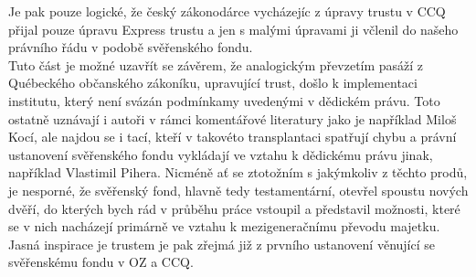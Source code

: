 \documentclass{article}
\begin{document}
Je pak pouze logické, že český zákonodárce vycházejíc z úpravy trustu v CCQ přijal pouze úpravu Express trustu a jen s malými úpravami ji včlenil do našeho právního řádu v podobě svěřenského fondu.\\

Tuto část je možné uzavřít se závěrem, že analogickým převzetím pasáží z Québeckého občanského zákoníku, upravující trust, došlo k implementaci institutu, který není svázán podmínkamy uvedenými v dědickém právu. Toto ostatně uznávají i autoři v rámci komentářové literatury jako je například Miloš Kocí, ale najdou se i tací, kteří v takovéto transplantaci spatřují chybu a právní ustanovení svěřenského fondu vykládají ve vztahu k dědickému právu jinak, například Vlastimil Pihera. Nicméně ať se ztotožním s jakýmkoliv z těchto prodů, je nesporné, že svěřenský fond, hlavně tedy testamentární, otevřel spoustu nových dvěří, do kterých bych rád v průběhu práce vstoupil a představil možnosti, které se v nich nacházejí primárně ve vztahu k mezigeneračnímu převodu majetku.\\

Jasná inspirace je trustem je pak zřejmá již z prvního ustanovení věnující se svěřenskému fondu v OZ a CCQ.\\



 
\end{document}

